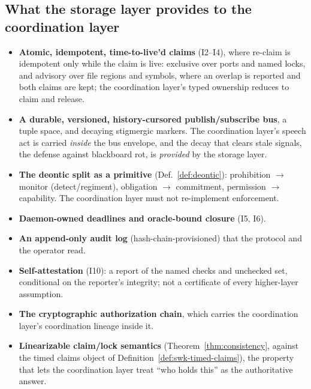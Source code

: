 \documentclass[11pt,a4paper]{article}
\theoremstyle{definition}
\theoremstyle{remark}
\begin{document}
\subsection{What the storage layer provides to the coordination layer}
\begin{itemize}[leftmargin=1.4em]
  \item \textbf{Atomic, idempotent, time-to-live'd claims} (I2--I4), where
  re-claim is idempotent only while the claim is live: exclusive
  over ports and named locks, and advisory over file regions and symbols, where
  an overlap is reported and both claims are kept; the coordination layer's typed
  ownership reduces to claim and release.
  \item \textbf{A durable, versioned, history-cursored publish/subscribe bus}, a
  tuple space, and decaying stigmergic markers. The coordination layer's speech
  act is carried \emph{inside} the bus envelope, and the decay that clears stale
  signals, the defense against blackboard rot, is \emph{provided} by the
  storage layer.
  \item \textbf{The deontic split as a primitive} (Def.~\ref{def:deontic}):
  prohibition $\to$ monitor (detect/regiment), obligation $\to$ commitment,
  permission $\to$ capability. The coordination layer must not re-implement
  enforcement.
  \item \textbf{Daemon-owned deadlines and oracle-bound closure} (I5, I6).
  \item \textbf{An append-only audit log} (hash-chain-provisioned) that the protocol
  and the operator read.
  \item \textbf{Self-attestation} (I10): a report of the named checks and unchecked
  set, conditional on the reporter's integrity; not a certificate of every
  higher-layer assumption.
  \item \textbf{The cryptographic authorization chain}, which carries the
  coordination layer's coordination lineage inside it.
  \item \textbf{Linearizable claim/lock semantics} (Theorem~\ref{thm:consistency},
  against the timed claims object of Definition~\ref{def:swk-timed-claims}),
  the property that lets the coordination layer treat ``who holds this'' as the
  authoritative answer.
\end{itemize}
\end{document}
